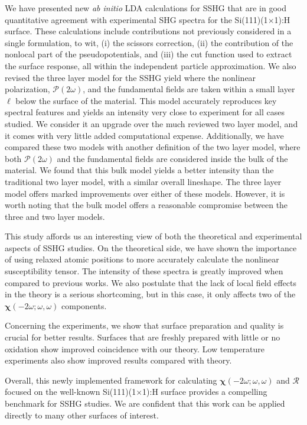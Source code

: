 \documentclass[prb,superscriptaddress,showpacs,twocolumn,letterpaper]{revtex4}
\begin{document}
We have presented new \emph{ab initio} LDA calculations for SSHG that are in
good quantitative agreement with experimental SHG spectra for the
Si(111)(1$\times$1):H surface. These calculations include contributions not
previously considered in a single formulation, to wit, (i) the scissors
correction, (ii) the contribution of the nonlocal part of the pseudopotentials,
and (iii) the cut function used to extract the surface response, all within the
independent particle approximation. We also revised the three layer model for
the SSHG yield where the nonlinear polarization,
$\boldsymbol{\mathcal{P}}(2\omega)$, and the fundamental fields are taken within
a small layer $\ell$ below the surface of the material. This model accurately
reproduces key spectral features and yields an intensity very close to
experiment for all cases studied. We consider it an upgrade over the much
reviewed two layer model\cite{mizrahiJOSA88}, and it comes with very little
added computational expense. Additionally, we have compared these two models
with another definition of the two layer model, where both
$\boldsymbol{\mathcal{P}}(2\omega)$ and the fundamental fields are considered
inside the bulk of the material. We found that this bulk model yields a better
intensity than the traditional two layer model, with a similar overall
lineshape. The three layer model offers marked improvements over either of these
models. However, it is worth noting that the bulk model offers a reasonable
compromise between the three and two layer models.

This study affords us an interesting view of both the theoretical and
experimental aspects of SSHG studies. On the theoretical side, we have shown the
importance of using relaxed atomic positions to more accurately calculate the
nonlinear susceptibility tensor. The intensity of these spectra is greatly
improved when compared to previous works.\cite{mejiaPRB02} We also postulate
that the lack of local field effects in the theory is a serious shortcoming, but
in this case, it only affects two of the
$\boldsymbol{\chi}(-2\omega;\omega,\omega)$ components.

Concerning the experiments, we show that surface preparation and quality is
crucial for better results. Surfaces that are freshly prepared with little or no
oxidation show improved coincidence with our theory. Low temperature experiments
also show improved results compared with theory.

Overall, this newly implemented framework for calculating
$\boldsymbol{\chi}(-2\omega;\omega,\omega)$ and $\mathcal{R}$ focused on the
well-known Si(111)(1$\times$1):H surface provides a compelling benchmark for
SSHG studies. We are confident that this work can be applied directly to many
other surfaces of interest.
\end{document}
